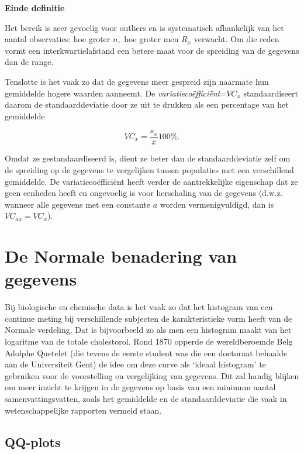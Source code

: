 \documentclass[
  12pt,dutch,coursenotes]{book}
\begin{document}
\textbf{Einde definitie}

Het bereik is zeer gevoelig voor outliers en is systematisch afhankelijk van
het aantal observaties: hoe groter \(n,\) hoe groter men \(R_x\) verwacht. Om
die reden vormt een interkwartielafstand een betere maat voor de spreiding
van de gegevens dan de range.

Tenslotte is het vaak zo dat de gegevens meer gespreid zijn naarmate hun
gemiddelde hogere waarden aanneemt. De \emph{variatiecoëfficiënt}=\(VC_x\)
standaardiseert daarom de standaarddeviatie door ze uit te drukken als een
percentage van het gemiddelde

\begin{equation*}
VC_x = \frac{s_x}{\bar{x}} 100\%.
\end{equation*}

Omdat ze gestandaardiseerd is, dient ze beter dan de standaarddeviatie zelf om de spreiding op de gegevens te vergelijken tussen populaties met een verschillend gemiddelde. De variatiecoëfficiënt heeft verder de aantrekkelijke eigenschap dat ze geen eenheden heeft en ongevoelig is
voor herschaling van de gegevens (d.w.z. wanneer alle gegevens met een
constante \(a\) worden vermenigvuldigd, dan is \(VC_{ax}=VC_x\)).

\hypertarget{sec:normal}{%
\section{De Normale benadering van gegevens}\label{sec:normal}}

Bij biologische en chemische data is het vaak zo dat het histogram van een continue
meting bij verschillende subjecten de karakteristieke vorm heeft van de
Normale verdeling. Dat is bijvoorbeeld zo als men een histogram maakt van het
logaritme van de totale cholestorol. Rond 1870 opperde de wereldberoemde
Belg Adolphe Quetelet (die tevens de eerste student was die een doctoraat behaalde aan de Universiteit
Gent) de idee om deze curve als `ideaal histogram' te gebruiken voor de
voorstelling en vergelijking van gegevens. Dit zal handig blijken om meer
inzicht te krijgen in de gegevens op basis van een minimum aantal
samenvattingsvatten, zoals het gemiddelde en de standaarddeviatie die vaak
in wetenschappelijke rapporten vermeld staan.

\hypertarget{sec:qq}{%
\subsection{QQ-plots}\label{sec:qq}}
\end{document}
